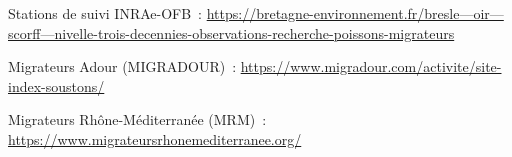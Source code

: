 \documentclass[11pt,twocolumn,titlepage,twoside]{article}\usepackage[]{graphicx}\usepackage[]{color}
\begin{document}
Stations de suivi INRAe-OFB~:      
\href{https://bretagne-environnement.fr/bresle---oir---scorff---nivelle-trois-decennies-observations-recherche-poissons-migrateurs}{{https://bretagne-environnement.fr/bresle---oir---scorff---nivelle-trois-decennies-observations-recherche-poissons-migrateurs}}

Migrateurs Adour (MIGRADOUR)~:                          
\href{https://www.migradour.com/activite/site-index-soustons/}{{https://www.migradour.com/activite/site-index-soustons/}}

Migrateurs Rhône-Méditerranée (MRM)~:            
\href{https://www.migrateursrhonemediterranee.org/}{{https://www.migrateursrhonemediterranee.org/}}



\printbibliography

\clearpage
\end{document}
